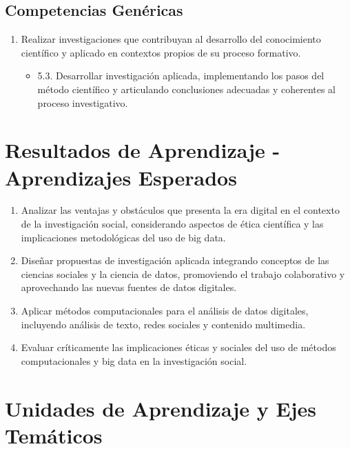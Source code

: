 \documentclass[11pt,letter,]{article}
\providecommand{\tightlist}{%
  \setlength{\itemsep}{0pt}\setlength{\parskip}{0pt}}
\begin{document}
\hypertarget{competencias-genuxe9ricas}{%
\subsection{Competencias Genéricas}\label{competencias-genuxe9ricas}}

\begin{enumerate}
\def\labelenumi{\arabic{enumi}.}
\setcounter{enumi}{4}
\tightlist
\item
  Realizar investigaciones que contribuyan al desarrollo del
  conocimiento científico y aplicado en contextos propios de su proceso
  formativo.

  \begin{itemize}
  \tightlist
  \item
    5.3. Desarrollar investigación aplicada, implementando los pasos del
    método científico y articulando conclusiones adecuadas y coherentes
    al proceso investigativo.
  \end{itemize}
\end{enumerate}

\hypertarget{resultados-de-aprendizaje---aprendizajes-esperados}{%
\section{Resultados de Aprendizaje - Aprendizajes
Esperados}\label{resultados-de-aprendizaje---aprendizajes-esperados}}

\begin{enumerate}
\def\labelenumi{\arabic{enumi}.}
\tightlist
\item
  Analizar las ventajas y obstáculos que presenta la era digital en el
  contexto de la investigación social, considerando aspectos de ética
  científica y las implicaciones metodológicas del uso de big data.
\item
  Diseñar propuestas de investigación aplicada integrando conceptos de
  las ciencias sociales y la ciencia de datos, promoviendo el trabajo
  colaborativo y aprovechando las nuevas fuentes de datos digitales.
\item
  Aplicar métodos computacionales para el análisis de datos digitales,
  incluyendo análisis de texto, redes sociales y contenido multimedia.
\item
  Evaluar críticamente las implicaciones éticas y sociales del uso de
  métodos computacionales y big data en la investigación social.
\end{enumerate}

\hypertarget{unidades-de-aprendizaje-y-ejes-temuxe1ticos}{%
\section{Unidades de Aprendizaje y Ejes
Temáticos}\label{unidades-de-aprendizaje-y-ejes-temuxe1ticos}}
\end{document}
